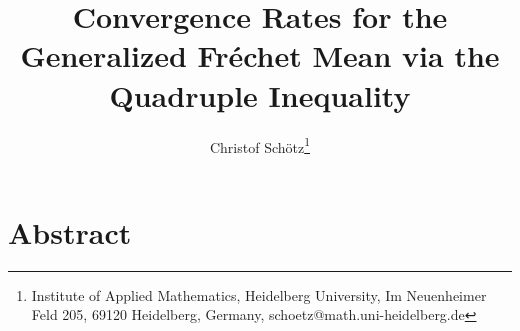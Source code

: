 \documentclass{scrartcl}
\begin{document}
%
%
%
\title{Convergence Rates for the Generalized Fréchet Mean via the Quadruple Inequality}
\author{Christof Schötz\thanks{Institute of Applied Mathematics,
Heidelberg University,
Im Neuenheimer Feld 205,
69120 Heidelberg, Germany,
schoetz@math.uni-heidelberg.de}}
%
\maketitle
%
\section*{Abstract}

%
\tableofcontents
%





%

\begin{appendices}

\end{appendices}
%
{}
\printindex[inot]
{}
\printindex[iass]
%
{}
\printbibliography
%
%
%
\end{document}
